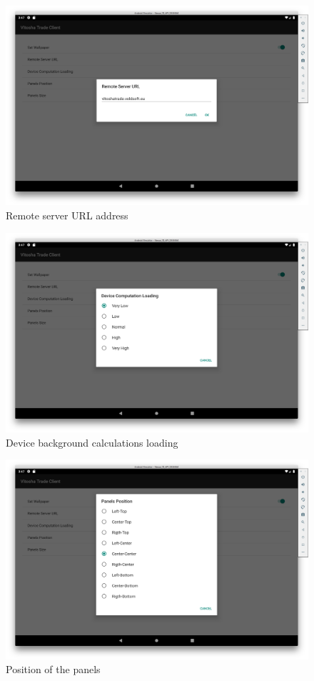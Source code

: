 \documentclass[a4paper,conference]{IEEEtran}
\begin{document}
\begin{figure}[htbp]
\centerline{\includegraphics[width=1.0\linewidth]{fig03.png}}
\caption{Remote server URL address}
\label{fig03}
\end{figure}

\begin{figure}[htbp]
\centerline{\includegraphics[width=1.0\linewidth]{fig04.png}}
\caption{Device background calculations loading}
\label{fig04}
\end{figure}

\begin{figure}[htbp]
\centerline{\includegraphics[width=1.0\linewidth]{fig05.png}}
\caption{Position of the panels}
\label{fig05}
\end{figure}
\end{document}

